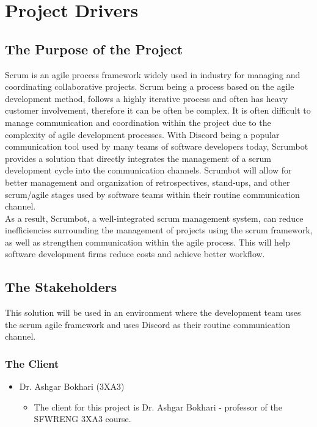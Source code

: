 \documentclass[12pt, titlepage]{article}
\begin{document}
\section{Project Drivers}

\subsection{The Purpose of the Project}
Scrum is an agile process framework widely used in industry for managing and coordinating collaborative projects. Scrum being a process based on the agile development method, follows a highly iterative process and often has heavy customer involvement, therefore it can be often be complex. It is often difficult to manage communication and coordination within the project due to the complexity of agile development processes. With Discord being a popular communication tool used by many teams of software developers today, Scrumbot provides a solution that directly integrates the management of a scrum development cycle into the communication channels. Scrumbot will allow for better management and organization of retrospectives, stand-ups, and other scrum/agile stages used by software teams within their routine communication channel.\\

As a result, Scrumbot, a well-integrated scrum management system, can reduce inefficiencies surrounding the management of projects using the scrum framework, as well as strengthen communication within the agile process. This will help software development firms reduce costs and achieve better workflow.

\subsection{The Stakeholders}
This solution will be used in an environment where the development team uses the scrum agile framework and uses Discord as their routine communication channel.

\subsubsection{The Client}
\begin{itemize}
    \item Dr. Ashgar Bokhari (3XA3)
    \begin{itemize}
      \item[] The client for this project is Dr. Ashgar Bokhari - professor of the SFWRENG 3XA3 course.
    \end{itemize}
\end{itemize}
\end{document}
